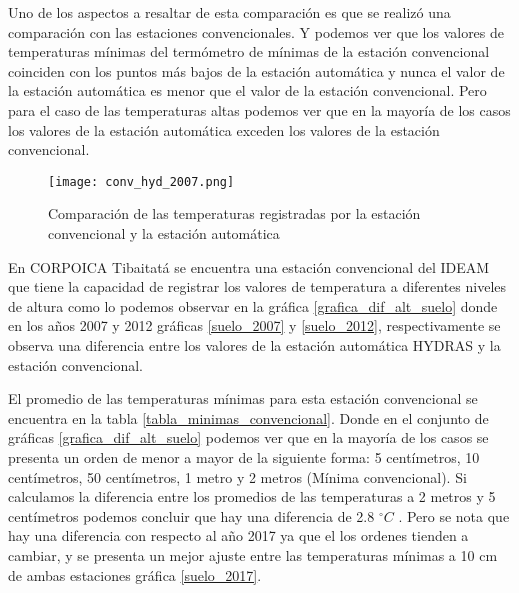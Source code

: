 \documentclass[11pt]{article}
\def\celc{$^{\circ}C$ }%
\begin{document}
Uno de los aspectos a resaltar de esta comparación es que se realizó una comparación con las estaciones convencionales. Y podemos ver que los valores de temperaturas mínimas del termómetro de mínimas de la estación convencional coinciden con los puntos más bajos de la estación automática y nunca el valor de la estación automática es menor que el valor de la estación convencional. Pero para el caso de las temperaturas altas podemos ver que en la mayoría de los casos los valores de la estación automática exceden los valores de la estación convencional.

 

\begin{figure}[H]
	\begin{center}
	\texttt{[image: conv\_hyd\_2007.png]}
		\caption{Comparación de las temperaturas registradas por la estación convencional y la estación automática}
		\label{subfig:b1}
	\end{center}
\end{figure}

En CORPOICA Tibaitatá se encuentra una estación convencional del IDEAM que tiene la capacidad de registrar los valores de temperatura a diferentes niveles de altura como lo podemos observar en la gráfica \ref{grafica_dif_alt_suelo} donde en los años 2007 y 2012 gráficas \ref{suelo_2007} y \ref{suelo_2012}, respectivamente se observa una diferencia entre los valores de la estación automática HYDRAS y la estación convencional.

El promedio de las temperaturas mínimas para esta estación convencional se encuentra en la tabla \ref{tabla_minimas_convencional}. Donde en el conjunto de gráficas \ref{grafica_dif_alt_suelo} podemos ver que en la mayoría de los casos se presenta un orden de menor a mayor de la siguiente forma: 5 centímetros, 10 centímetros, 50 centímetros, 1 metro y 2 metros (Mínima convencional). Si calculamos la diferencia entre los promedios de las temperaturas a 2 metros y 5 centímetros podemos concluir que hay una diferencia de 2.8 \celc. Pero se nota que hay una diferencia con respecto al año 2017 ya que el los ordenes tienden a cambiar, y se presenta un mejor ajuste entre las temperaturas mínimas a 10 cm de ambas estaciones gráfica \ref{suelo_2017}.
\end{document}
